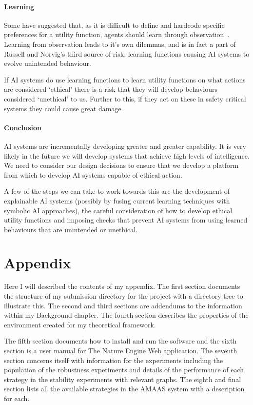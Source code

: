 \documentclass[]{final_report}
\begin{document}
\subsubsection{Learning}
Some have suggested that, as it is difficult to define and hardcode specific preferences for a utility function, agents should learn through observation~\cite{armstrong2015motivated, abel2016reinforcement}. Learning from observation leads to it's own dilemmas, and is in fact a part of Russell and Norvig's third source of risk: learning functions causing AI systems to evolve unintended behaviour.\par 
If AI systems do use learning functions to learn utility functions on what actions are considered `ethical' there is a risk that they will develop behaviours considered `unethical' to us. Further to this, if they act on these in safety critical systems they could cause great damage.

\subsubsection{Conclusion}
AI systems are incrementally developing greater and greater capability. It is very likely in the future we will develop systems that achieve high levels of intelligence. We need to consider our design decisions to ensure that we develop a platform from which to develop AI systems capable of ethical action.\par 
A few of the steps we can take to work towards this are the development of explainable AI systems (possibly by fusing current learning techniques with symbolic AI approaches), the careful consideration of how to develop ethical utility functions and imposing checks that prevent AI systems from using learned behaviours that are unintended or unethical.

\chapter{Appendix}
\label{appendix}
Here I will described the contents of my appendix. The first section documents the structure of my submission directory for the project with a directory tree to illustrate this. The second and third sections are addendums to the information within my Background chapter. The fourth section describes the properties of the environment created for my theoretical framework.\par 
The fifth section documents how to install and run the software and the sixth section is a user manual for The Nature Engine Web application. The seventh section concerns itself with information for the experiments including the population of the robustness experiments and details of the performance of each strategy in the stability experiments with relevant graphs. The eighth and final section lists all the available strategies in the AMAAS system with a description for each.
\end{document}
